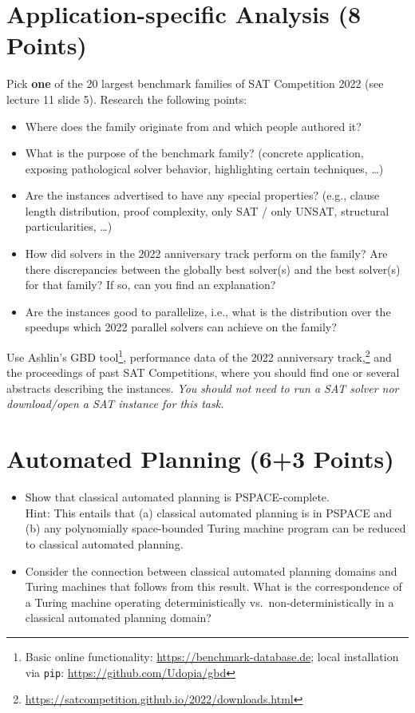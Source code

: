 \documentclass[a4paper]{article}
\begin{document}


\section{Application-specific Analysis (8 Points)}

Pick \textbf{one} of the 20 largest benchmark families of SAT Competition 2022 (see lecture 11 slide 5).
Research the following points:
\begin{itemize}
	\item Where does the family originate from and which people authored it?
	\item What is the purpose of the benchmark family? (concrete application, exposing pathological solver behavior, highlighting certain techniques, \ldots)
	\item Are the instances advertised to have any special properties? (e.g., clause length distribution, proof complexity, only SAT / only UNSAT, structural particularities, \ldots)
	\item How did solvers in the 2022 anniversary track perform on the family? Are there discrepancies between the globally best solver(s) and the best solver(s) for that family? If so, can you find an explanation?
	\item Are the instances good to parallelize, i.e., what is the distribution over the speedups which 2022 parallel solvers can achieve on the family?
\end{itemize}
Use Ashlin's GBD tool\footnote{
	Basic online functionality: \url{https://benchmark-database.de}; local installation via \texttt{pip}: \url{https://github.com/Udopia/gbd}
}, performance data of the 2022 anniversary track,\footnote{
	\url{https://satcompetition.github.io/2022/downloads.html}
} and the proceedings of past SAT Competitions, where you should find one or several abstracts describing the instances.
\textit{You should not need to run a SAT solver nor download/open a SAT instance for this task.}


\section{Automated Planning (6+3 Points)}

\begin{itemize}
	\item[(a)] Show that classical automated planning is PSPACE-complete.\\
	Hint: This entails that (a) classical automated planning is in PSPACE and (b) any polynomially space-bounded Turing machine program can be reduced to classical automated planning.
	\item[(b)] Consider the connection between classical automated planning domains and Turing machines that follows from this result.
	What is the correspondence of a Turing machine operating deterministically vs.~non-deterministically in a classical automated planning domain?
\end{itemize}
\end{document}
